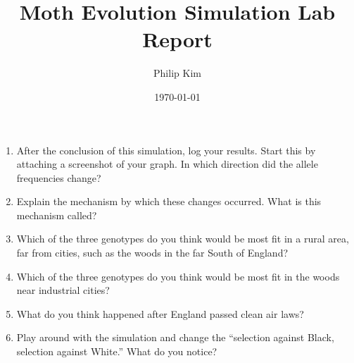 \documentclass{article}
\title{Moth Evolution Simulation Lab Report}
\author{Philip Kim}
\date{\today}
\begin{document}
\maketitle
\begin{enumerate}
  \item After the conclusion of this simulation, log your results. Start this by attaching a screenshot of your graph. In which direction did the allele frequencies change?
  \item Explain the mechanism by which these changes occurred. What is this mechanism called?
  \item Which of the three genotypes do you think would be most fit in a rural area, far from cities, such as the woods in the far South of England?
  \item Which of the three genotypes do you think would be most fit in the woods near industrial cities?
  \item What do you think happened after England passed clean air laws?
  \item Play around with the simulation and change the ``selection against Black, selection against White.'' What do you notice?
\end{enumerate}
\end{document}
